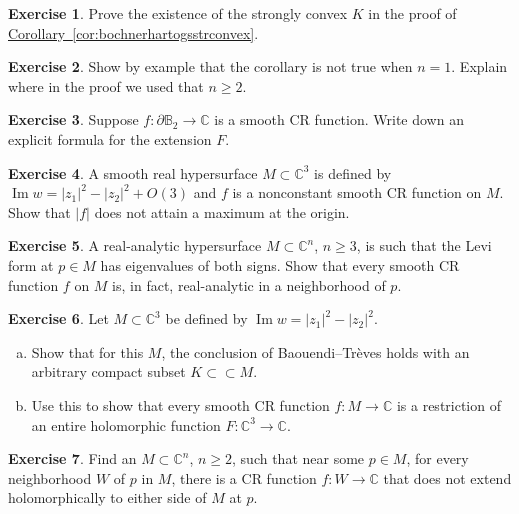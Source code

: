 \documentclass[12pt,openany]{book}
\renewcommand{\Im}{\operatorname{Im}}
\newcommand{\sabs}[1]{\lvert {#1} \rvert}
\newcommand{\C}{{\mathbb{C}}}
\newcommand{\bB}{{\mathbb{B}}}
\theoremstyle{plain}
\theoremstyle{remark}
\theoremstyle{definition}
\newenvironment{exbox}{%
    \def\FrameCommand{\vrule width 1pt \relax\hspace{10pt}}%
    \MakeFramed{\advance\hsize-\width\FrameRestore}%
}{%
    \endMakeFramed
}
\newenvironment{exparts}{%
    \leavevmode\begin{enumerate}[a),noitemsep,topsep=0pt,parsep=0pt,partopsep=0pt]
}{%
    \end{enumerate}
}
\theoremstyle{exercise}
\newtheorem{exercise}{Exercise}[section]
\theoremstyle{example}
\newcommand{\corref}[1]{\hyperref[#1]{Corollary~\ref*{#1}}}
\begin{document}
\begin{exbox}
\begin{exercise}
Prove the existence of the strongly convex $K$ in the proof of
\corref{cor:bochnerhartogsstrconvex}.
\end{exercise}

\begin{exercise}
Show by example that the corollary is not true when $n=1$.  Explain where in
the proof we used that $n \geq 2$.
\end{exercise}

\begin{exercise}
Suppose $f \colon \partial \bB_2 \to \C$ is a smooth CR function.
Write down an explicit formula for the extension $F$.
\end{exercise}

\begin{exercise}
A smooth real hypersurface $M \subset \C^3$ is defined by $\Im w = \sabs{z_1}^2-\sabs{z_2}^2 + O(3)$
and $f$ is a nonconstant smooth CR function on $M$.  Show
that $\sabs{f}$ does not attain a maximum at the origin.
\end{exercise}

\begin{exercise}
A real-analytic hypersurface
$M \subset \C^n$, $n \geq 3$, is
such that the Levi form at $p \in M$ has eigenvalues of both signs.
Show that every smooth CR function $f$ on $M$ is, in fact, real-analytic in
a neighborhood of $p$.
\end{exercise}

\begin{exercise}
\pagebreak[2]
Let $M \subset \C^3$ be defined by $\Im w = \sabs{z_1}^2-\sabs{z_2}^2$.
\begin{exparts}
\item
Show that for this $M$,
the conclusion of Baouendi--Tr{\`e}ves holds with
an arbitrary compact subset $K \subset \subset M$.
\item
Use this to show that every
smooth CR function $f \colon M \to \C$ is a restriction of an entire holomorphic function
$F \colon \C^3 \to \C$.
\end{exparts}
\end{exercise}

\begin{exercise}
Find an $M \subset \C^n$, $n \geq 2$, such that near some $p \in M$,
for every neighborhood $W$ of $p$ in $M$, there is a CR function $f \colon
W \to \C$ that does not extend holomorphically to either side of $M$ at $p$.
\end{exercise}


\end{exbox}
\end{document}
